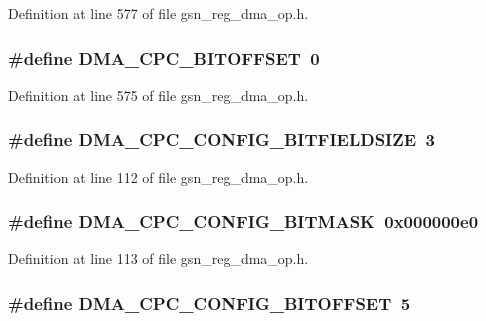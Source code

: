 Definition at line 577 of file gsn\_\-reg\_\-dma\_\-op.h.

\hypertarget{a00547_adaf660c298b54dad3b51399247ae5da4}{
\subsubsection[{DMA\_\-CPC\_\-BITOFFSET}]{\setlength{\rightskip}{0pt plus 5cm}\#define DMA\_\-CPC\_\-BITOFFSET~0}}
\label{a00547_adaf660c298b54dad3b51399247ae5da4}


Definition at line 575 of file gsn\_\-reg\_\-dma\_\-op.h.

\hypertarget{a00547_a4f72a0c45e3181273b66098bcc479228}{
\subsubsection[{DMA\_\-CPC\_\-CONFIG\_\-BITFIELDSIZE}]{\setlength{\rightskip}{0pt plus 5cm}\#define DMA\_\-CPC\_\-CONFIG\_\-BITFIELDSIZE~3}}
\label{a00547_a4f72a0c45e3181273b66098bcc479228}


Definition at line 112 of file gsn\_\-reg\_\-dma\_\-op.h.

\hypertarget{a00547_ac5e794e02a86f98fdb696b4d3e71aecd}{
\subsubsection[{DMA\_\-CPC\_\-CONFIG\_\-BITMASK}]{\setlength{\rightskip}{0pt plus 5cm}\#define DMA\_\-CPC\_\-CONFIG\_\-BITMASK~0x000000e0}}
\label{a00547_ac5e794e02a86f98fdb696b4d3e71aecd}


Definition at line 113 of file gsn\_\-reg\_\-dma\_\-op.h.

\hypertarget{a00547_ab242bf9b2f92d776f1019ef9ffcb8a4c}{
\subsubsection[{DMA\_\-CPC\_\-CONFIG\_\-BITOFFSET}]{\setlength{\rightskip}{0pt plus 5cm}\#define DMA\_\-CPC\_\-CONFIG\_\-BITOFFSET~5}}
\label{a00547_ab242bf9b2f92d776f1019ef9ffcb8a4c}


